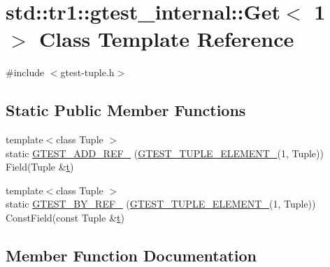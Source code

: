 \hypertarget{classstd_1_1tr1_1_1gtest__internal_1_1_get_3_011_01_4}{}\section{std\+::tr1\+::gtest\+\_\+internal\+::Get$<$ 1 $>$ Class Template Reference}
\label{classstd_1_1tr1_1_1gtest__internal_1_1_get_3_011_01_4}


{\ttfamily \#include $<$gtest-\/tuple.\+h$>$}

\subsection*{Static Public Member Functions}
\begin{DoxyCompactItemize}
\item 
{\footnotesize template$<$class Tuple $>$ }\\static \mbox{\hyperlink{classstd_1_1tr1_1_1gtest__internal_1_1_get_3_011_01_4_a52b2f5d2bc283d76a3e8dede84dba154}{G\+T\+E\+S\+T\+\_\+\+A\+D\+D\+\_\+\+R\+E\+F\+\_\+}} (\mbox{\hyperlink{gtest-tuple_8h_a1b7f133d8aa02e0b7afed7b66781eeb7}{G\+T\+E\+S\+T\+\_\+\+T\+U\+P\+L\+E\+\_\+\+E\+L\+E\+M\+E\+N\+T\+\_\+}}(1, Tuple)) Field(Tuple \&\mbox{\hyperlink{_mutual_8h_a978d88b393c8a37dc2614c88788b3442}{t}})
\item 
{\footnotesize template$<$class Tuple $>$ }\\static \mbox{\hyperlink{classstd_1_1tr1_1_1gtest__internal_1_1_get_3_011_01_4_a481a2bf839c758408d46a1d0d41ff8f4}{G\+T\+E\+S\+T\+\_\+\+B\+Y\+\_\+\+R\+E\+F\+\_\+}} (\mbox{\hyperlink{gtest-tuple_8h_a1b7f133d8aa02e0b7afed7b66781eeb7}{G\+T\+E\+S\+T\+\_\+\+T\+U\+P\+L\+E\+\_\+\+E\+L\+E\+M\+E\+N\+T\+\_\+}}(1, Tuple)) Const\+Field(const Tuple \&\mbox{\hyperlink{_mutual_8h_a978d88b393c8a37dc2614c88788b3442}{t}})
\end{DoxyCompactItemize}


\subsection{Member Function Documentation}
\mbox{\label{classstd_1_1tr1_1_1gtest__internal_1_1_get_3_011_01_4_a52b2f5d2bc283d76a3e8dede84dba154}} 
